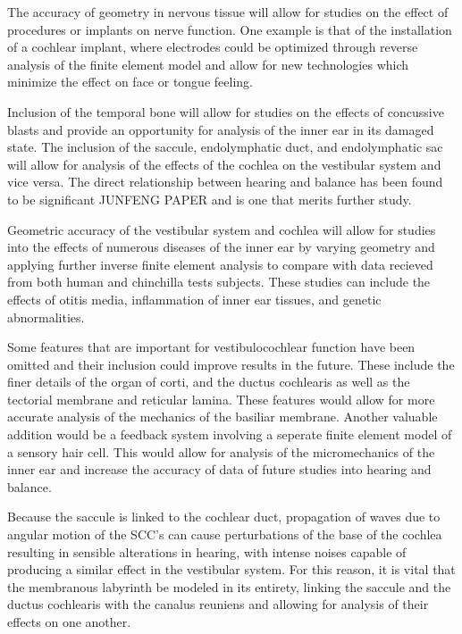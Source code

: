 \documentclass[12pt]{article}
\begin{document}
The accuracy of geometry in nervous tissue will allow for studies on the effect of procedures or implants on nerve function. One example is that of the installation of a cochlear implant, where electrodes could be optimized through reverse analysis of the finite element model and allow for new technologies which minimize the effect on face or tongue feeling. 

Inclusion of the temporal bone will allow for studies on the effects of concussive blasts and provide an opportunity for analysis of the inner ear in its damaged state. The inclusion of the saccule, endolymphatic duct, and endolymphatic sac will allow for analysis of the effects of the cochlea on the vestibular system and vice versa. The direct relationship between hearing and balance has been found to be significant JUNFENG PAPER and is one that merits further study.

Geometric accuracy of the vestibular system and cochlea will allow for studies into the effects of numerous diseases of the inner ear by varying geometry and applying further inverse finite element analysis to compare with data recieved from both human and chinchilla tests subjects. These studies can include the effects of otitis media, inflammation of inner ear tissues, and genetic abnormalities.

Some features that are important for vestibulocochlear function have been omitted and their inclusion could improve results in the future. These include the finer details of the organ of corti, and the ductus cochlearis as well as the tectorial membrane and reticular lamina. These features would allow for more accurate analysis of the mechanics of the basiliar membrane. Another valuable addition would be a feedback system involving a seperate finite element model of a sensory hair cell. This would allow for analysis of the micromechanics of the inner ear and increase the accuracy of data of future studies into hearing and balance. \cite{choi}

 Because the saccule is linked to the cochlear duct, propagation of waves due to angular motion of the SCC’s can cause perturbations of the base of the cochlea resulting in sensible alterations in hearing, with intense noises capable of producing a similar effect in the vestibular system. For this reason, it is vital that the membranous labyrinth be modeled in its entirety, linking the saccule and the ductus cochlearis with the canalus reuniens and allowing for analysis of their effects on one another.
   
\end{document}
